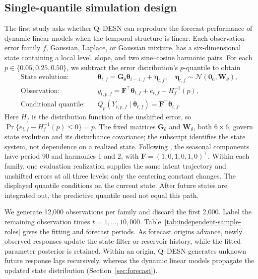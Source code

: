 \documentclass[12pt,letterpaper]{article}
\numberwithin{equation}{section}
\newcommand{\Normal}{\mathcal{N}}
\newcommand{\vect}[1]{\bm{#1}}
\newcommand{\mat}[1]{\bm{#1}}
\newcommand{\zeros}[1]{\vect 0_{#1}}
\begin{document}
\subsection{Single-quantile simulation design}
\label{subsec:simulation-single-design}

The first study asks whether Q--DESN can reproduce the forecast performance
of dynamic linear models when the temporal structure is linear. Each
observation-error family \(f\), Gaussian, Laplace, or Gaussian mixture,
has a six-dimensional state containing a local level, slope, and two
sine--cosine harmonic pairs. For each \(p\in\{0.05,0.25,0.50\}\), we
subtract the error distribution's \(p\)-quantile to obtain
\begin{equation}
\begin{aligned}
\text{State evolution:}\quad
&\vect\theta_{t,f}=\mat G_\theta\vect\theta_{t-1,f}+\vect\eta_{t,f},
\quad \vect\eta_{t,f}\sim\Normal(\zeros{6},\mat W_\theta),\\
\text{Observation:}\quad
&y_{t,p,f}=\vect F^\top\vect\theta_{t,f}+e_{t,f}-H_f^{-1}(p),\\
\text{Conditional quantile:}\quad
&Q_p(Y_{t,p,f}\mid\vect\theta_{t,f})=\vect F^\top\vect\theta_{t,f}.
\end{aligned}
\label{eq:single-quantile-dgp-main}
\end{equation}
Here \(H_f\) is the distribution function of the unshifted error, so
\(\Pr\{e_{t,f}-H_f^{-1}(p)\leq0\}=p\). The fixed matrices
\(\mat G_\theta\) and \(\mat W_\theta\), both \(6\times6\), govern
state evolution and its disturbance covariance; the subscript identifies the
state system, not dependence on a realized state. Following
\citet{WestHarrison1997}, the seasonal components have period 90 and
harmonics 1 and 2, with \(\vect F=(1,0,1,0,1,0)^\top\). Within each
family, one evaluation realization supplies the same latent trajectory and
unshifted errors at all three levels; only the centering constant changes.
The displayed quantile conditions on the current state. After future states
are integrated out, the predictive quantile need not equal this path.

We generate 12,000 observations per family and discard the first 2,000.
Label the remaining observation times \(t=1,\ldots,10{,}000\).
Table~\ref{tab:independent-sample-roles} gives the fitting and forecast
periods. As forecast origins advance, newly observed responses update the
state filter or reservoir history, while the fitted parameter posterior is
retained. Within an origin, Q--DESN
generates unknown future response lags recursively, whereas the dynamic
linear models propagate the updated state distribution
(Section~\ref{sec:forecast}).
\end{document}
